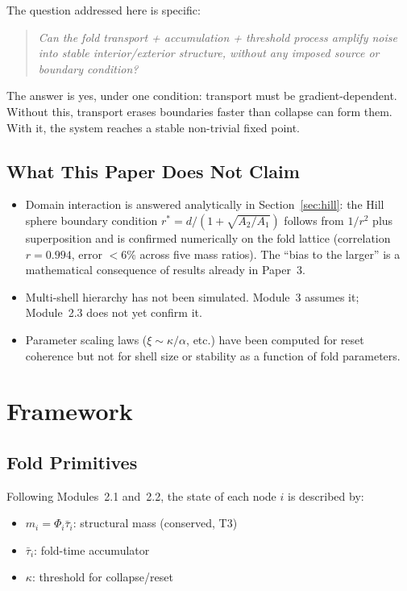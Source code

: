 \documentclass[12pt]{article}
\newcommand{\taubar}{\bar{\tau}}
\begin{document}
The question addressed here is specific:

\begin{quote}
\textit{Can the fold transport + accumulation + threshold process
amplify noise into stable interior/exterior structure, without any
imposed source or boundary condition?}
\end{quote}

The answer is yes, under one condition: transport must be
gradient-dependent. Without this, transport erases boundaries faster
than collapse can form them. With it, the system reaches a stable
non-trivial fixed point.

\subsection{What This Paper Does Not Claim}

\begin{itemize}
  \item Domain interaction is answered analytically in Section~\ref{sec:hill}:
        the Hill sphere boundary condition $r^* = d/(1+\sqrt{A_2/A_1})$
        follows from $1/r^2$ plus superposition and is confirmed numerically
        on the fold lattice (correlation $r=0.994$, error $<6\%$ across
        five mass ratios). The ``bias to the larger'' is a mathematical
        consequence of results already in Paper~3.
  \item Multi-shell hierarchy has not been simulated.
        Module~3 assumes it; Module~2.3 does not yet confirm it.
  \item Parameter scaling laws ($\xi \sim \kappa/\alpha$, etc.)
        have been computed for reset coherence but not for shell
        size or stability as a function of fold parameters.
\end{itemize}

\section{Framework}

\subsection{Fold Primitives}

Following Modules~2.1 and~2.2, the state of each node $i$ is
described by:
\begin{itemize}
  \item $m_i = \Phi_i \taubar_i$: structural mass (conserved, T3)
  \item $\taubar_i$: fold-time accumulator
  \item $\kappa$: threshold for collapse/reset
\end{itemize}
\end{document}
